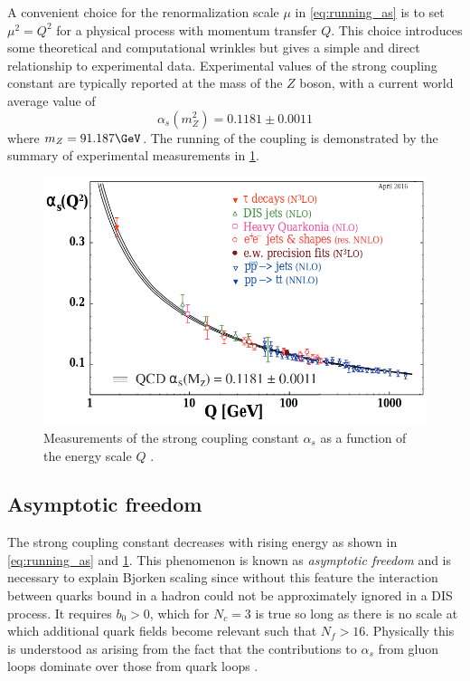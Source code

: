 A convenient choice for the renormalization scale $\mu$ in \cref{eq:running_as} is to set $\mu^2 = Q^2$ for a physical process with momentum transfer $Q$.
This choice introduces some theoretical and computational wrinkles but gives a simple and direct relationship to experimental data.
Experimental values of the strong coupling constant are typically reported at the mass of the $Z$ boson, with a current world average value of
\[
\alpha_s(m_Z^2) = 0.1181 \pm 0.0011
\]
where $m_Z = 91.187 \GeV$.
The running of the coupling is demonstrated by the summary of experimental measurements in \cref{fig:running_coupling}.

\begin{figure}[t]
  \includegraphics{running_as.png}
  \caption{Measurements of the strong coupling constant $\alpha_s$ as a function of the energy scale $Q$ \cite{Tanabashi:2018oca}.}
  \label{fig:running_coupling}
\end{figure}

\subsection{Asymptotic freedom}

The strong coupling constant decreases with rising energy as shown in \cref{eq:running_as} and \cref{fig:running_coupling}.
This phenomenon is known as \emph{asymptotic freedom} and is necessary to explain Bjorken scaling since without this feature the interaction between quarks bound in a hadron could not be approximately ignored in a \ac{DIS} process.
It requires $b_0 > 0$, which for $N_c = 3$ \qcd is true so long as there is no scale at which additional quark fields become relevant such that $N_f > 16$.
Physically this is understood as arising from the fact that the contributions to $\alpha_s$ from gluon loops dominate over those from quark loops \cite{Wilczek:2005az}.

